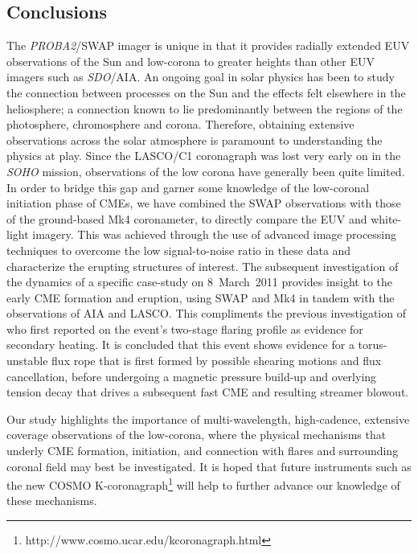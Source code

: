 \documentclass[namedreferences]{solarphysics}
\begin{document}
\begin{article}
{\section{Conclusions}
\label{sect:conclusions}

The \emph{PROBA2}/SWAP imager is unique in that it provides radially extended EUV observations of the Sun and low-corona to greater heights than other EUV imagers such as \emph{SDO}/AIA. An ongoing goal in solar physics has been to study the connection between processes on the Sun and the effects felt elsewhere in the heliosphere; a connection known to lie predominantly between the regions of the photosphere, chromosphere and corona. Therefore, obtaining extensive observations across the solar atmosphere is paramount to understanding the physics at play. Since the LASCO/C1 coronagraph was lost very early on in the \emph{SOHO} mission, observations of the low corona have generally been quite limited. In order to bridge this gap and garner some knowledge of the low-coronal initiation phase of CMEs, we have combined the SWAP observations with those of the ground-based Mk4 coronameter, to directly compare the EUV and white-light imagery. This was achieved through the use of advanced image processing techniques to overcome the low signal-to-noise ratio in these data and characterize the erupting structures of interest. The subsequent investigation of the dynamics of a specific case-study on 8~March~2011 provides insight to the early CME formation and eruption, using SWAP and Mk4 in tandem with the observations of AIA and LASCO. This compliments the previous investigation of  who first reported on the event's two-stage flaring profile as evidence for secondary heating. It is concluded that this event shows evidence for a torus-unstable flux rope that is first formed by possible shearing motions and flux cancellation, before undergoing a magnetic pressure build-up and overlying tension decay that drives a subsequent fast CME and resulting streamer blowout. 

Our study highlights the importance of multi-wavelength, high-cadence, extensive coverage observations of the low-corona, where the physical mechanisms that underly CME formation, initiation, and connection with flares and surrounding coronal field may best be investigated. It is hoped that future instruments such as the new COSMO K-coronagraph\footnote{http://www.cosmo.ucar.edu/kcoronagraph.html} will help to further advance our knowledge of these mechanisms.

}
\end{article}
\end{document}
